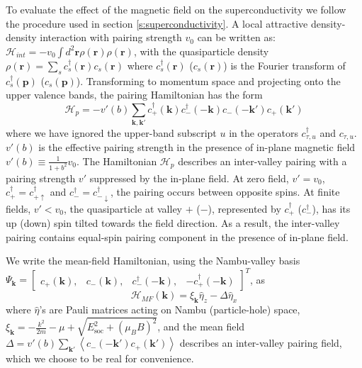To evaluate the effect of the magnetic field on the superconductivity we follow the procedure used in section \ref{s:superconductivity}. A local attractive density-density
interaction with pairing strength $v_{0}$ can be written as: $\mathcal{H}_{int}=-v_{0}\int d^{2}\mathbf{r}\rho(\mathbf{r})\rho(\mathbf{r})$,
with the quasiparticle density $\rho(\mathbf{r})=\sum_{s}c_{s}^{\dagger}(\mathbf{r})c_{s}(\mathbf{r})$
where $c_{s}^{\dagger}(\mathbf{r})$ ($c_{s}(\mathbf{r})$) is the
Fourier transform of $c_{s}^{\dagger}(\mathbf{p})$ ($c_{s}(\mathbf{p})$).
Transforming to momentum space and projecting onto the upper valence
bands, the pairing Hamiltonian has the form
\begin{equation}
\mathcal{H}_{p}=-v'(b)\sum_{\mathbf{k},\mathbf{k}'}c_{+}^{\dagger}(\mathbf{k})c_{-}^{\dagger}(-\mathbf{k})c_{-}(-\mathbf{k}')c_{+}(\mathbf{k}')\label{eq: pairing_Hamiltonian}
\end{equation}
where we have ignored the upper-band subscript $u$ in the operators
$c_{\tau,u}^{\dagger}$ and $c_{\tau,u}$. $v'(b)$ is the effective
pairing strength in the presence of in-plane magnetic field $v'(b)\equiv\frac{1}{1+b^{2}}v_{0}$.
The Hamiltonian $\mathcal{H}_{p}$ describes an inter-valley pairing
with a pairing strength $v'$ suppressed by the in-plane field. At
zero field, $v'=v_{0}$, $c_{+}^{\dagger}=c_{+\uparrow}^{\dagger}$ and
$c_{-}^{\dagger}=c_{-\downarrow}^{\dagger}$, the pairing occurs between
opposite spins. At finite fields, $v'<v_{0}$, the quasiparticle at valley
$+$ ($-$), represented by $c_{+}^{\dagger}$ ($c_{-}^{\dagger}$),
has its up (down) spin tilted towards the field direction. As a result,
the inter-valley pairing contains equal-spin pairing component in
the presence of in-plane field.

We write the mean-field Hamiltonian, using the Nambu-valley basis
$\Psi_{\mathbf{k}}=\left[\begin{array}{cccc}
c_{+}(\mathbf{k}), & c_{-}(\mathbf{k}), & c_{-}^{\dagger}(-\mathbf{k}), & -c_{+}^{\dagger}(-\mathbf{k})\end{array}\right]^{T}$, as
\begin{equation}
\mathcal{H}_{MF}(\mathbf{k})=\xi_{\mathbf{k}}\hat{\eta}_{z}-\Delta\hat{\eta}_{x}\label{eq: Mean_Field_Hamiltonian}
\end{equation}
where $\hat{\eta}$'s are Pauli matrices acting on Nambu (particle-hole)
space, $\xi_{\mathbf{k}}=-\frac{k^{2}}{2m}-\mu+\sqrt{E_{\text{soc}}^{2}+\left(\mu_{B}B\right)^{2}}$,
and the mean field $\Delta=v'(b)\sum_{\mathbf{k}'}\left\langle c_{-}(-\mathbf{k}')c_{+}(\mathbf{k}')\right\rangle $
describes an inter-valley pairing field, which we choose to be real
for convenience.

